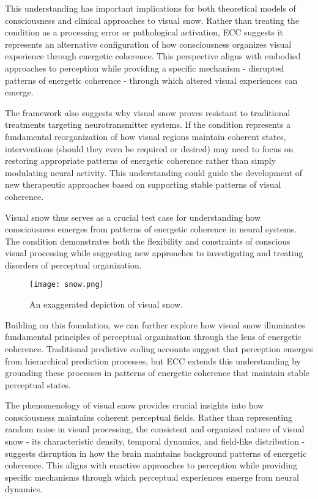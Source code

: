 This understanding has important implications for both theoretical models of consciousness and clinical approaches to visual snow. Rather than treating the condition as a processing error or pathological activation, ECC suggests it represents an alternative configuration of how consciousness organizes visual experience through energetic coherence. This perspective aligns with embodied approaches to perception \cite{ORegan2001} while providing a specific mechanism - disrupted patterns of energetic coherence - through which altered visual experiences can emerge.

The framework also suggests why visual snow proves resistant to traditional treatments targeting neurotransmitter systems. If the condition represents a fundamental reorganization of how visual regions maintain coherent states, interventions (should they even be required or desired) may need to focus on restoring appropriate patterns of energetic coherence rather than simply modulating neural activity. This understanding could guide the development of new therapeutic approaches based on supporting stable patterns of visual coherence.

Visual snow thus serves as a crucial test case for understanding how consciousness emerges from patterns of energetic coherence in neural systems. The condition demonstrates both the flexibility and constraints of conscious visual processing while suggesting new approaches to investigating and treating disorders of perceptual organization.

\begin{figure}[h]
    \centering
    \texttt{[image: snow.png]}

    \caption{An exaggerated depiction of visual snow.}
\end{figure}

Building on this foundation, we can further explore how visual snow illuminates fundamental principles of perceptual organization through the lens of energetic coherence. Traditional predictive coding accounts \cite{Rao1999, Friston2009} suggest that perception emerges from hierarchical prediction processes, but ECC extends this understanding by grounding these processes in patterns of energetic coherence that maintain stable perceptual states.

The phenomenology of visual snow provides crucial insights into how consciousness maintains coherent perceptual fields. Rather than representing random noise in visual processing, the consistent and organized nature of visual snow - its characteristic density, temporal dynamics, and field-like distribution - suggests disruption in how the brain maintains background patterns of energetic coherence. This aligns with enactive approaches to perception \cite{Varela1991} while providing specific mechanisms through which perceptual experiences emerge from neural dynamics.

